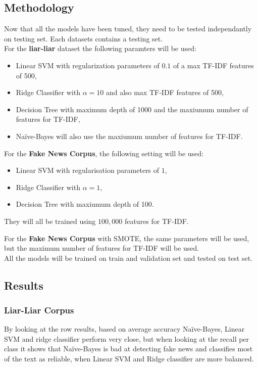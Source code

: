 \subsection{Methodology}
Now that all the models have been tuned, they need to be tested independantly on testing set. Each datasets contains a testing set. \\

For the \textbf{liar-liar} dataset the following paramters will be used:
\begin{itemize}
	\item Linear SVM with regularization parameters of $0.1$ of a max TF-IDF features of 500,
	\item Ridge Classifier with $\alpha = 10$ and also max TF-IDF features of 500,
	\item Decision Tree with maximum depth of 1000 and the maxiumum number of features for TF-IDF,
	\item Na\"{i}ve-Bayes will also use the maxiumum number of features for TF-IDF.
\end{itemize}

For the \textbf{Fake News Corpus}, the following setting will be used:
\begin{itemize}
	\item Linear SVM with regularisation parameters of $1$,
	\item Ridge Classifier with $\alpha = 1$,
	\item Decision Tree with maxiumum depth of 100.
\end{itemize}

They will all be trained using $100,000$ features for TF-IDF.

For the \textbf{Fake News Corpus} with SMOTE, the same parameters will be used, but the maximum number of features for TF-IDF will be used.\\

All the models will be trained on train and validation set and tested on test set. 

\subsection{Results}
\subsubsection{Liar-Liar Corpus}
By looking at the row results, based on average accuracy Na\"{i}ve-Bayes, Linear SVM and ridge classifier perform very close, but when looking at the recall per class it shows that Na\"{i}ve-Bayes is bad at detecting fake news and classifies most of the text as reliable, when Linear SVM and Ridge classifier are more balanced. 

